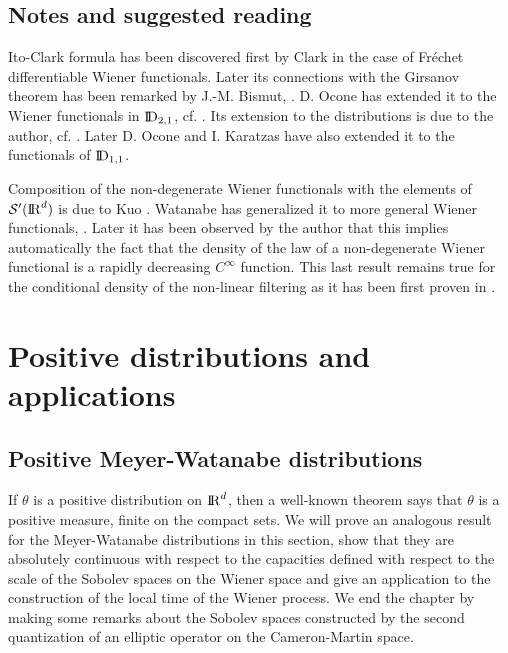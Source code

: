 \documentclass[12pt,a4paper]{book}
\newcommand{\DD}{{\rm I\!D}}
\newcommand{\R}{{\rm I\!R}}
\begin{document}
\section*{Notes and suggested reading}
{\footnotesize{Ito-Clark formula has been discovered first by Clark in
    the case of Fr\'echet differentiable Wiener functionals. Later its
    connections with the Girsanov theorem has been remarked by
    J.-M. Bismut, \cite{Bi}. D. Ocone has extended it to the Wiener
    functionals in $\DD_{2,1}$, cf. \cite{O}. Its extension to the
    distributions is due to the author, cf. \cite{U0}. Later D. Ocone
    and I. Karatzas have also extended it to the functionals of
    $\DD_{1,1}$.

 Composition of the non-degenerate Wiener functionals with the
 elements of ${\mathcal{S}}'(\R^d)$ is due to Kuo \cite{KUO1}.
 Watanabe has generalized it to more general Wiener functionals,
 \cite{W1,W}. Later it has been observed by the author  that this implies
 automatically the fact that the density of the law of a
 non-degenerate Wiener functional is a rapidly decreasing $C^\infty$
 function. This last result remains true for the conditional density
 of the non-linear filtering as it has been first proven in \cite{U4}.








}}









\chapter{Positive distributions and  applications}
\label{ch.posit}

\section{Positive Meyer-Watanabe distributions}

If $\theta$ is a positive distribution on $\R^d$, then a well-known theorem
says that $\theta$ is a positive measure, finite on the compact sets. We will
prove an analogous result for the  Meyer-Watanabe distributions  in this
section, show that they are absolutely continuous with respect to the
capacities defined with respect to the scale of the Sobolev spaces on
the Wiener space and  give an application to the construction of the
local time of the Wiener process. We end the chapter by making some
remarks about the Sobolev spaces constructed by the second
quantization of an elliptic operator on the Cameron-Martin space.
\end{document}
